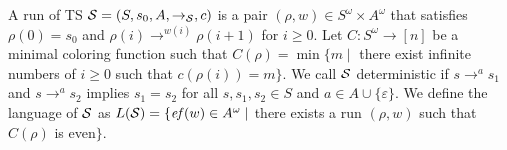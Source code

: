 A run of TS ${\cal S}=(S, s_0, A, \to_{\cal S}, c)$ is
a pair $(\rho, w)\in S^\omega \times A^\omega$ that satisfies
$\rho(0)=s_0$ and $\rho(i)\to^{w(i)}\rho(i+1)$ for $i\geq 0$.
Let $C: S^\omega \to [n]$ be a minimal coloring function such that
$C(\rho)=\min\{m\mid$ there exist infinite numbers of $i\geq 0$ such that $c(\rho(i)) = m\}$.
We call ${\cal S}$ deterministic if $s\to^a s_1$ and $s\to^a s_2$ implies $s_1=s_2$ for all $s,s_1,s_2\in S$ and $a\in A\cup\{\varepsilon\}$.
We define the language of ${\cal S}$ as
$L({\cal S})=\{\mathit{ef}(w)\in A^\omega\mid$
there exists a run $(\rho,w)$ such that $C(\rho)$ is even$\}$.
